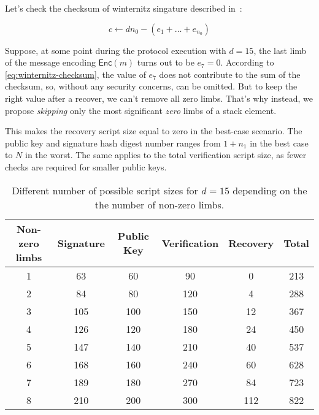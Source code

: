 \documentclass{iacrtrans}
\begin{document}
Let's check the checksum of winternitz singature described
in~\cite{applied-crypto}:

\begin{equation}
  c \gets d n_0 - (e_1 + \ldots + e_{n_0})
\end{equation}\label{eq:winternitz-checksum}

Suppose, at some point during the protocol execution with $d=15$, the last limb of the message encoding $\mathsf{Enc}(m)$ turns out to be $e_{7} = 0$. According to \eqref{eq:winternitz-checksum}, the value of
$e_{7}$ does not contribute to the sum of the checksum, so, without any security concerns, can be omitted. But to keep the right value
after a recover, we can't remove all zero limbs. That's why
instead, we propose \textit{skipping} only the most significant \textit{zero} limbs
of a stack element.

This makes the recovery script size equal to zero in the best-case scenario. The public key and signature hash digest number ranges from $1 + n_1$ in the best case to $N$ in the worst. The same applies to the total verification script size, as fewer checks are required for smaller public keys.

\iffalse{}
\begin{verbatim}
import math
l = 32
d = 15
w = math.ceil(math.log(d+1, 2))
n0 = math.ceil(l / w)
n1 = math.ceil((2**w * n0).bit_length() / w)

for z in range(1, 8+1):
    k = z + n1
    
    pk_size = 20 * k
    ver_size = 2 * d * k
    sig_size = 21*k
    rec_size = 0
    for i in range(0, z):
        rec_size += int(i * w)
    
    total = pk_size + ver_size + rec_size + sig_size
    
    print(f"{z} & {sig_size} & {pk_size} & {ver_size} & {rec_size} & {total} \\\\")
\end{verbatim}
\fi
\begin{table}[H]
  \centering
  \begin{tabular}{cccccc}
    \toprule
    \textbf{Non-zero limbs} & \textbf{Signature} & \textbf{Public Key} & \textbf{Verification} & \textbf{Recovery} & \textbf{Total} \\
    \midrule
    1 & 63 & 60 & 90 & 0 & 213 \\
    2 & 84 & 80 & 120 & 4 & 288 \\
    3 & 105 & 100 & 150 & 12 & 367 \\
    4 & 126 & 120 & 180 & 24 & 450 \\
    5 & 147 & 140 & 210 & 40 & 537 \\
    6 & 168 & 160 & 240 & 60 & 628 \\
    7 & 189 & 180 & 270 & 84 & 723 \\
    8 & 210 & 200 & 300 & 112 & 822 \\
    \bottomrule
  \end{tabular}
  \caption{Different number of possible script sizes for $d = 15$
    depending on the the number of non-zero
    limbs.}\label{tab:winternitz-script-size}
\end{table}
\end{document}
